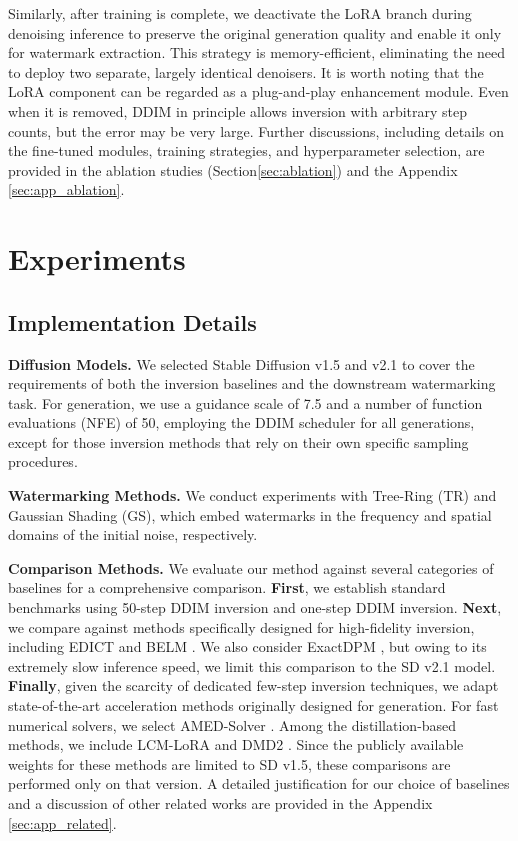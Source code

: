 \documentclass{article}
\begin{document}
Similarly, after training is complete, we deactivate the LoRA branch during denoising inference to preserve the original generation quality and enable it only for watermark extraction. This strategy is memory-efficient, eliminating the need to deploy two separate, largely identical denoisers. It is worth noting that the LoRA component can be regarded as a plug-and-play enhancement module. Even when it is removed, DDIM in principle allows inversion with arbitrary step counts, but the error may be very large.
Further discussions, including details on the fine-tuned modules, training strategies, and hyperparameter selection, are provided in the ablation studies (Section\ref{sec:ablation}) and the Appendix \ref{sec:app_ablation}.



\section{Experiments}

\subsection{Implementation Details}
\label{sec:exp_set}

\textbf{Diffusion Models.}
We selected Stable Diffusion v1.5 and v2.1 \citep{ldm_2022} to cover the requirements of both the inversion baselines and the downstream watermarking task. For generation, we use a guidance scale of 7.5 and a number of function evaluations (NFE) of 50, employing the DDIM scheduler for all generations, except for those inversion methods that rely on their own specific sampling procedures.

\textbf{Watermarking Methods.}
We conduct experiments with Tree-Ring \citep{treering_2023} (TR) and Gaussian Shading \citep{gs_2024} (GS), which embed watermarks in the frequency and spatial domains of the initial noise, respectively.

\textbf{Comparison Methods.}
We evaluate our method against several categories of baselines for a comprehensive comparison.
\textbf{First}, we establish standard benchmarks using 50-step DDIM inversion and one-step DDIM inversion. 
\textbf{Next}, we compare against methods specifically designed for high-fidelity inversion, including EDICT \citep{edict2023} and BELM \citep{belm2024}. We also consider ExactDPM \citep{exactdpm2024}, but owing to its extremely slow inference speed, we limit this comparison to the SD v2.1 model.
\textbf{Finally}, given the scarcity of dedicated few-step inversion techniques, we adapt state-of-the-art acceleration methods originally designed for generation. For fast numerical solvers, we select AMED-Solver \citep{amed2024}. Among the distillation-based methods, we include LCM-LoRA \citep{lcmlora2023} and DMD2 \citep{dmd2_2024}. Since the publicly available weights for these methods are limited to SD v1.5, these comparisons are performed only on that version.
A detailed justification for our choice of baselines and a discussion of other related works are provided in the Appendix \ref{sec:app_related}.
\end{document}
